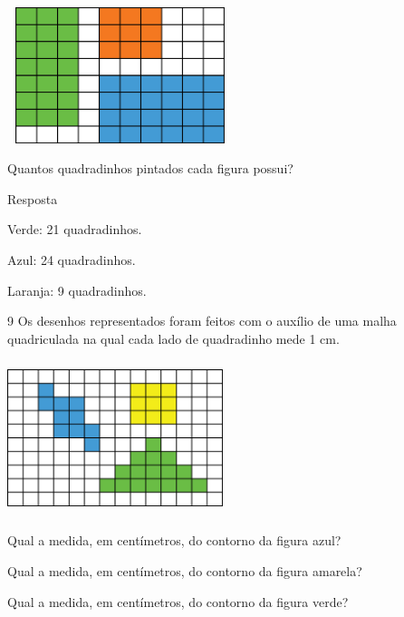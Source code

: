 
\includegraphics[width=2.59189in,height=1.55847in]{media/image56.png}

Quantos quadradinhos pintados cada figura possui?


Resposta

Verde: 21 quadradinhos.

Azul: 24 quadradinhos.

Laranja: 9 quadradinhos.

\num{9} Os desenhos representados foram feitos com o auxílio de uma malha
quadriculada na qual cada lado de quadradinho mede 1 cm.


\includegraphics[width=2.47521in,height=1.77515in]{media/image57.png}

\begin{escolha}

\item
  Qual a medida, em centímetros, do contorno da figura azul?
\coment{18 cm}

\item
  Qual a medida, em centímetros, do contorno da figura amarela?
\coment{12 cm}

\item
  Qual a medida, em centímetros, do contorno da figura verde?
\coment{22 cm}

\end{escolha}

